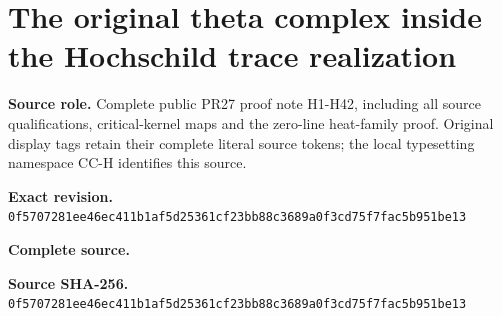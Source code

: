 \begingroup
\sloppy
\small
\makeatletter
\let\EndpointOriginalTagForm\tagform@
\def\tagform@#1{\EndpointOriginalTagForm{CC-H\, #1}}
\makeatother
\clearpage
\section{The original theta complex inside the Hochschild trace realization}
\noindent\textbf{Source role.} Complete public PR27 proof note H1-H42, including all source qualifications, critical-kernel maps and the zero-line heat-family proof. Original display tags retain their complete literal source tokens; the local typesetting namespace CC-H identifies this source.\par
\noindent\textbf{Exact revision.} \nolinkurl{0f5707281ee46ec411b1af5d25361cf23bb88c3689a0f3cd75f7fac5b951be13}\par
\noindent\textbf{Complete source.} \par
\noindent\textbf{Source SHA-256.} \nolinkurl{0f5707281ee46ec411b1af5d25361cf23bb88c3689a0f3cd75f7fac5b951be13}\par\medskip

\endgroup
